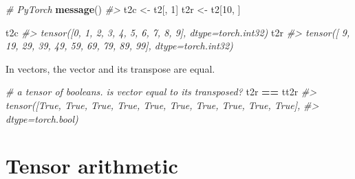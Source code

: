 \documentclass[]{book}
\newenvironment{Shaded}{\begin{snugshade}}{\end{snugshade}}
\newcommand{\CommentTok}[1]{\textcolor[rgb]{0.56,0.35,0.01}{\textit{#1}}}
\newcommand{\DataTypeTok}[1]{\textcolor[rgb]{0.13,0.29,0.53}{#1}}
\newcommand{\DecValTok}[1]{\textcolor[rgb]{0.00,0.00,0.81}{#1}}
\newcommand{\KeywordTok}[1]{\textcolor[rgb]{0.13,0.29,0.53}{\textbf{#1}}}
\newcommand{\NormalTok}[1]{#1}
\newcommand{\OperatorTok}[1]{\textcolor[rgb]{0.81,0.36,0.00}{\textbf{#1}}}
\newcommand{\StringTok}[1]{\textcolor[rgb]{0.31,0.60,0.02}{#1}}
\begin{document}
\begin{Shaded}
\begin{Highlighting}[]
\CommentTok{# PyTorch}
\KeywordTok{message}\NormalTok{()}
\CommentTok{#> }
\NormalTok{t2c <-}\StringTok{ }\NormalTok{t2[, }\DecValTok{1}\NormalTok{]}
\NormalTok{t2r <-}\StringTok{ }\NormalTok{t2[}\DecValTok{10}\NormalTok{, ]}

\NormalTok{t2c}
\CommentTok{#> tensor([0, 1, 2, 3, 4, 5, 6, 7, 8, 9], dtype=torch.int32)}
\NormalTok{t2r}
\CommentTok{#> tensor([ 9, 19, 29, 39, 49, 59, 69, 79, 89, 99], dtype=torch.int32)}
\end{Highlighting}
\end{Shaded}

In vectors, the vector and its transpose are equal.

\begin{Shaded}
\end{Shaded}

\begin{Shaded}
\begin{Highlighting}[]
\CommentTok{# a tensor of booleans. is vector equal to its transposed?}
\NormalTok{t2r }\OperatorTok{==}\StringTok{ }\NormalTok{tt2r}
\CommentTok{#> tensor([True, True, True, True, True, True, True, True, True, True],}
\CommentTok{#>        dtype=torch.bool)}
\end{Highlighting}
\end{Shaded}

\hypertarget{tensor-arithmetic}{%
\section{Tensor arithmetic}\label{tensor-arithmetic}}
\end{document}
